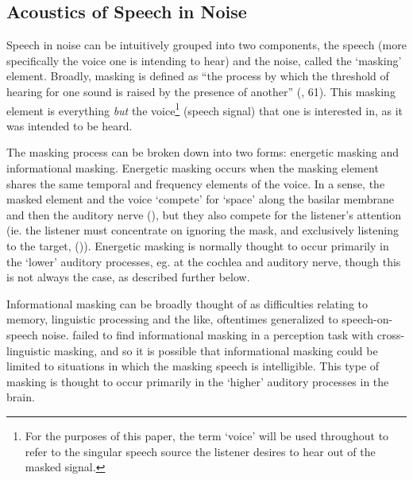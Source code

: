 \subsection{Acoustics of Speech in Noise}
\label{bkgrnd:speech_in_noise}

Speech in noise can be intuitively grouped into two components, the speech (more specifically the voice one is intending to hear) and the noise, called the `masking' element.  Broadly, masking is defined as ``the process by which the threshold of hearing for one sound is raised by the presence of another'' (\cite{ansi:13}, 61).  This masking element is everything \textit{but} the voice\footnote{For the purposes of this paper, the term `voice' will be used throughout to refer to the singular speech source the listener desires to hear out of the masked signal.} (speech signal) that one is interested in, as it was intended to be heard.

The masking process can be broken down into two forms: energetic masking and informational masking.  Energetic masking occurs when the masking element shares the same temporal and frequency elements of the voice.  In a sense, the masked element and the voice `compete' for `space' along the basilar membrane and then the auditory nerve (\cite{brungart:01}), but they also compete for the listener's attention (ie. the listener must concentrate on ignoring the mask, and exclusively listening to the target, (\cite{mattys:12})).  Energetic masking is normally thought to occur primarily in the `lower' auditory processes, eg. at the cochlea and auditory nerve, though this is not always the case, as described further below.  

Informational masking can be broadly thought of as difficulties relating to memory, linguistic processing and the like, oftentimes generalized to speech-on-speech noise.  \cite{mattys:10} failed to find informational masking in a perception task with cross-linguistic masking, and so it is possible that informational masking could be limited to situations in which the masking speech is intelligible. This type of masking is thought to occur primarily in the `higher' auditory processes in the brain.

